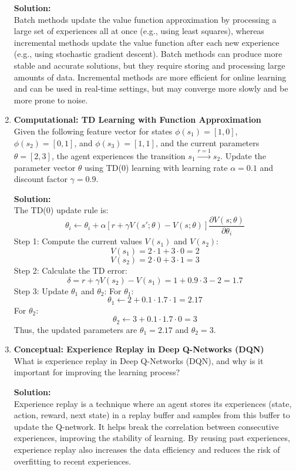 \documentclass{article}
\begin{document}
\begin{enumerate}[label=Q\arabic*.]
\textbf{Solution:} \\
Batch methods update the value function approximation by processing a large set of experiences all at once (e.g., using least squares), whereas incremental methods update the value function after each new experience (e.g., using stochastic gradient descent). Batch methods can produce more stable and accurate solutions, but they require storing and processing large amounts of data. Incremental methods are more efficient for online learning and can be used in real-time settings, but may converge more slowly and be more prone to noise.

\item \textbf{Computational: TD Learning with Function Approximation} \\
Given the following feature vector for states $\phi(s_1) = [1, 0]$, $\phi(s_2) = [0, 1]$, and $\phi(s_3) = [1, 1]$, and the current parameters $\theta = [2, 3]$, the agent experiences the transition $s_1 \xrightarrow{r=1} s_2$. Update the parameter vector $\theta$ using TD(0) learning with learning rate $\alpha = 0.1$ and discount factor $\gamma = 0.9$.

\textbf{Solution:} \\
The TD(0) update rule is:
\[
\theta_i \leftarrow \theta_i + \alpha \left[ r + \gamma V(s'; \theta) - V(s; \theta) \right] \frac{\partial V(s; \theta)}{\partial \theta_i}
\]
Step 1: Compute the current values $V(s_1)$ and $V(s_2)$:
\[
V(s_1) = 2 \cdot 1 + 3 \cdot 0 = 2
\]
\[
V(s_2) = 2 \cdot 0 + 3 \cdot 1 = 3
\]
Step 2: Calculate the TD error:
\[
\delta = r + \gamma V(s_2) - V(s_1) = 1 + 0.9 \cdot 3 - 2 = 1.7
\]
Step 3: Update $\theta_1$ and $\theta_2$:
For $\theta_1$:
\[
\theta_1 \leftarrow 2 + 0.1 \cdot 1.7 \cdot 1 = 2.17
\]
For $\theta_2$:
\[
\theta_2 \leftarrow 3 + 0.1 \cdot 1.7 \cdot 0 = 3
\]
Thus, the updated parameters are $\theta_1 = 2.17$ and $\theta_2 = 3$.

\item \textbf{Conceptual: Experience Replay in Deep Q-Networks (DQN)} \\
What is experience replay in Deep Q-Networks (DQN), and why is it important for improving the learning process?

\textbf{Solution:} \\
Experience replay is a technique where an agent stores its experiences (state, action, reward, next state) in a replay buffer and samples from this buffer to update the Q-network. It helps break the correlation between consecutive experiences, improving the stability of learning. By reusing past experiences, experience replay also increases the data efficiency and reduces the risk of overfitting to recent experiences.


\end{enumerate}
\end{document}
